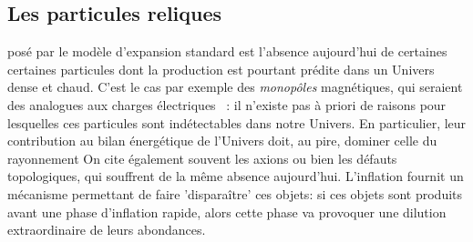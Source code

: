 \subsection{Les particules reliques}
 posé par le modèle d'expansion standard est l'absence aujourd'hui de certaines certaines particules dont la production est pourtant prédite dans un Univers dense et chaud. C'est le cas par exemple des \textit{monopôles} magnétiques, qui seraient des analogues aux charges électriques ~: il n'existe pas à priori de raisons pour lesquelles ces particules sont indétectables dans notre Univers. En particulier, leur contribution au bilan énergétique de l'Univers doit, au pire, dominer celle du rayonnement
On cite également souvent les axions ou bien les défauts topologiques, qui souffrent de la même absence aujourd'hui.
L'inflation fournit un mécanisme permettant de faire 'disparaître' ces objets: si ces objets sont produits avant une phase d'inflation rapide, alors cette phase va provoquer une dilution extraordinaire de leurs abondances. 

